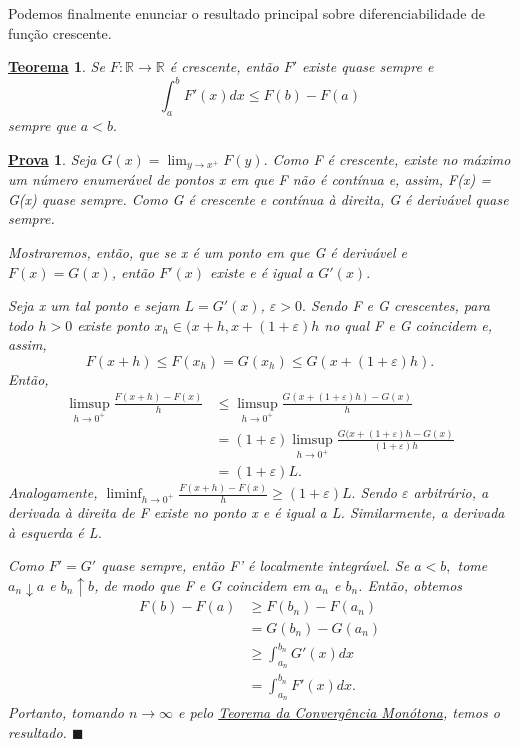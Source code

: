 \documentclass{article}
\newtheorem*{theorem*}{\underline{Teorema}}
\newtheorem*{proof*}{\underline{Prova}}
\renewcommand\qedsymbol{$\blacksquare$}
\begin{document}
  Podemos finalmente enunciar o resultado principal sobre diferenciabilidade de função crescente. 
 \begin{theorem*}
   Se \(F:\mathbb{R}\rightarrow \mathbb{R}\) é crescente, então \(F'\) existe quase sempre e 
     \[
       \int_{a}^{b}F'(x)dx \leq F(b) - F(a)
     \]
  sempre que \(a < b.\)
 \end{theorem*}
\begin{proof*}
  Seja \(G(x) = \lim_{y\to x^{+}}F(y).\) Como F é crescente, existe no máximo um número enumerável de pontos x em que F não é contínua e, assim, F(x) = G(x) quase sempre.
Como G é crescente e contínua à direita, G é derivável quase sempre. 

Mostraremos, então, que se x é um ponto em que G é derivável e \(F(x) = G(x)\), então \(F'(x)\) existe e é igual a \(G'(x).\)

Seja x um tal ponto e sejam \(L = G'(x)\), \(\varepsilon > 0.\) Sendo F e G crescentes, para todo \(h > 0\) existe ponto \(x_{h}\in (x+h, x + (1+\varepsilon )h\) no qual F e G coincidem e, assim, 
  \[
    F(x+h) \leq F(x_{h}) = G(x_{h}) \leq G(x+(1+\varepsilon )h).
  \]
Então, 
\begin{align*}
  \limsup_{h\to 0^{+}}\frac{F(x+h) - F(x)}{h} &\leq \limsup_{h\to 0^{+}}\frac{G(x+(1+\varepsilon )h)-G(x)}{h}\\ 
                                              &= (1+\varepsilon )\limsup_{h\to 0^{+}}\frac{G(x+(1+\varepsilon )h - G(x)}{(1+\varepsilon )h}\\ 
                                              &= (1+\varepsilon )L.
\end{align*}
Analogamente, \(\liminf_{h\to 0^{+}}\frac{F(x+h)-F(x)}{h}\geq (1+\varepsilon )L.\) Sendo \(\varepsilon \) arbitrário, a derivada à direita de F existe no ponto x e é igual a L. Similarmente, a derivada à esquerda é L. 

Como \(F'=G'\) quase sempre, então F' é localmente integrável. Se \(a < b,\) tome \(a_{n}\downarrow a\) e \(b_{n}\uparrow b\), de modo que F e G coincidem em \(a_{n}\) e \(b_{n}\). Então, obtemos 
\begin{align*}
  F(b) - F(a) &\geq F(b_{n}) - F(a_{n})\\ 
              &= G(b_{n}) - G(a_{n})\\ 
              &\geq \int_{a_{n}}^{b_{n}}G'(x)dx\\ 
              &= \int_{a_{n}}^{b_{n}}F'(x)dx.
\end{align*}
Portanto, tomando \(n\to \infty\) e pelo \hyperlink{monotone_convergence}{\textit{Teorema da Convergência Monótona}}, temos o resultado. \qedsymbol
\end{proof*}
\end{document}

